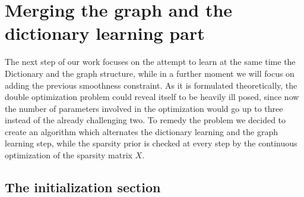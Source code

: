 \chapter{Merging the graph and the dictionary learning part}
\label{sec:GD}
The next step of our work focuses on the attempt to learn at the same time the Dictionary and the graph structure, while in a further moment we will focus on adding the previous smoothness constraint. As it is formulated theoretically, the double optimization problem could reveal itself to be heavily ill posed, since now the number of parameters involved in the optimization would go up to three instead of the already challenging two. To remedy the problem we decided to create an algorithm which alternates the dictionary learning and the graph learning step, while the sparsity prior is checked at every step by the continuous optimization of the sparsity matrix $X$.

\section{The initialization section}

